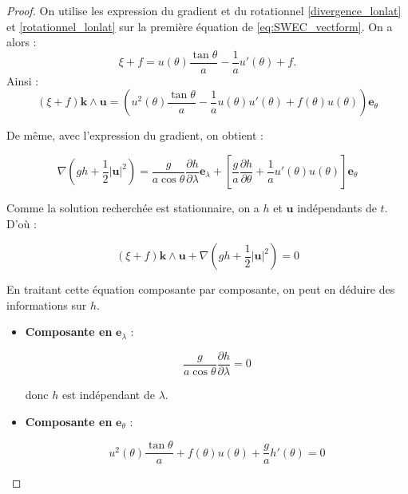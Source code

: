 \begin{proof}
On utilise les expression du gradient et du rotationnel \eqref{divergence_lonlat} et \eqref{rotationnel_lonlat} sur la première équation de \eqref{eq:SWEC_vectform}. On a alors :
\begin{equation}
\xi + f = u(\theta) \dfrac{\tan \theta}{a} - \dfrac{1}{a} u'(\theta) + f.
\end{equation}
Ainsi :
\begin{equation}
\left( \xi + f \right) \mathbf{k} \wedge \mathbf{u} = \left( u^2 (\theta) \dfrac{\tan \theta}{a} - \dfrac{1}{a} u(\theta) u'(\theta) + f(\theta) u(\theta) \right) \mathbf{e}_{\theta}
\end{equation}

De même, avec l'expression du gradient, on obtient :

\begin{equation}
\nabla \left( gh + \dfrac{1}{2} |\mathbf{u}|^2 \right) = \dfrac{g}{a \cos \theta} \dfrac{\partial h}{\partial \lambda} \mathbf{e}_{\lambda} + \left[ \dfrac{g}{a} \dfrac{\partial h}{\partial \theta} + \dfrac{1}{a} u'(\theta) u(\theta) \right] \mathbf{e}_{\theta}
\end{equation}

Comme la solution recherchée est stationnaire, on a $h$ et $\mathbf{u}$ indépendants de $t$. D'où :

\begin{equation}
\left( \xi + f \right) \mathbf{k} \wedge \mathbf{u} + \nabla \left( gh + \dfrac{1}{2} |\mathbf{u}|^2 \right) = 0
\end{equation}

En traitant cette équation composante par composante, on peut en déduire des informations sur $h$.

\begin{itemize}
\item \textbf{Composante en} $\mathbf{e}_{\lambda}$ : 

\begin{equation}
\dfrac{g}{a \cos \theta} \dfrac{\partial h}{\partial \lambda} = 0
\end{equation}

donc $h$ est indépendant de $\lambda$.

\item \textbf{Composante en} $\mathbf{e}_{\theta}$ :

\begin{equation}
u^2 (\theta) \dfrac{\tan \theta}{a}  + f(\theta) u(\theta) + \dfrac{g}{a} h'(\theta) = 0
\end{equation}


\end{itemize}
\end{proof}
